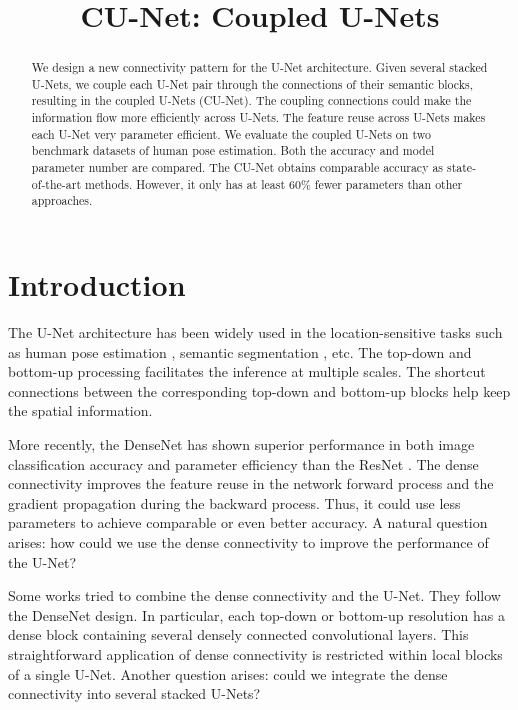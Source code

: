 \documentclass{bmvc2k}
\title{CU-Net: Coupled U-Nets}
\begin{document}
\maketitle
\begin{abstract}






We design a new connectivity pattern for the U-Net architecture. Given several stacked U-Nets, we couple each U-Net pair through the connections of their semantic blocks, resulting in the coupled U-Nets (CU-Net). The coupling connections could make the information flow more efficiently across U-Nets. The feature reuse across U-Nets makes each U-Net very parameter efficient. We evaluate the coupled U-Nets on two benchmark datasets of human pose estimation. Both the accuracy and model parameter number are compared. The CU-Net obtains comparable accuracy as state-of-the-art methods. However, it only has at least 60\% fewer parameters than other approaches.

\end{abstract} \section{Introduction}



The U-Net \cite{ronneberger2015u} architecture has been widely used in the location-sensitive tasks such as human pose estimation \cite{newell2016stacked}, semantic segmentation \cite{long2015fully}, etc. The top-down and bottom-up processing facilitates the inference at multiple scales. The shortcut connections between the corresponding top-down and bottom-up blocks help keep the spatial information.

More recently, the DenseNet \cite{huang2016densely} has shown superior performance in both image classification accuracy and parameter efficiency than the ResNet \cite{he2016deep}. The dense connectivity improves the feature reuse in the network forward process and the gradient propagation during the backward process. Thus, it could use less parameters to achieve comparable or even better accuracy. A natural question arises: how could we use the dense connectivity to improve the performance of the U-Net?

Some works \cite{jegou2017one, li2017h} tried to combine the dense connectivity and the U-Net. They follow the DenseNet design. In particular, each top-down or bottom-up resolution has a dense block containing several densely connected convolutional layers. This straightforward application of dense connectivity is restricted within local blocks of a single U-Net. Another question arises: could we integrate the dense connectivity into several stacked U-Nets?
\end{document}
